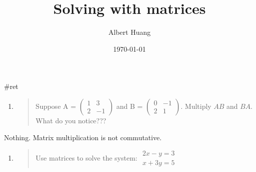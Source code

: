 \documentclass[letterpaper]{article}
\author{Albert Huang}
\date{\today}
\title{Solving with matrices}
\renewcommand{\tableofcontents}{}
\begin{document}
\tableofcontents

\#ret

\begin{enumerate}
\item \begin{quote}
Suppose A = \(\begin{pmatrix} 1 & 3\\ 2 & -1 \end{pmatrix}\) and B
= \(\begin{pmatrix} 0 & -1\\ 2 & 1 \end{pmatrix}\). Multiply \(AB\)
and \(BA\). What do you notice???
\end{quote}
\end{enumerate}

Nothing. Matrix multiplication is not commutative.

\begin{enumerate}
\item \begin{quote}
Use matrices to solve the system:
\(\begin{aligned}2x-y=3\\x+3y=5\end{aligned}\)
\end{quote}
\end{enumerate}
\end{document}
